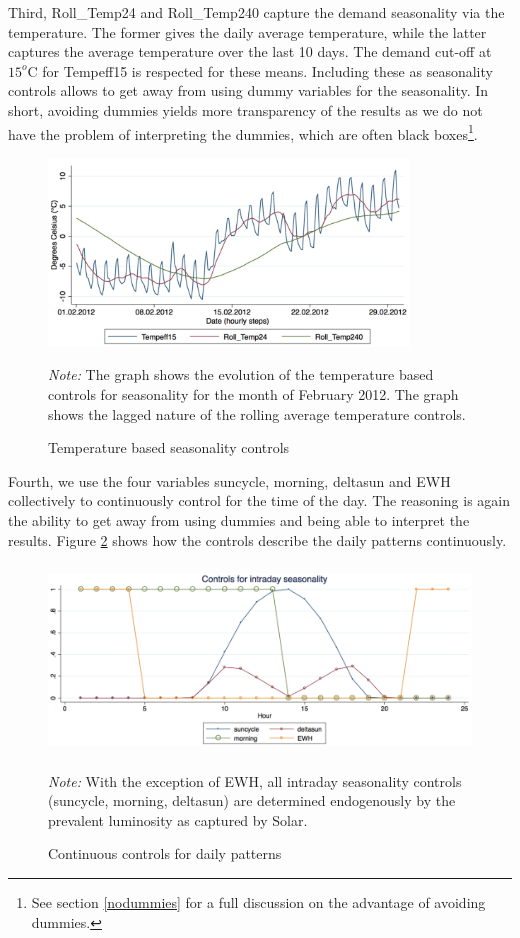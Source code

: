 Third, Roll\_Temp24 and Roll\_Temp240 capture the demand seasonality via the temperature. The former gives the daily average temperature, while the latter captures the average temperature over the last 10 days. The demand cut-off at $15^o$C for Tempeff15 is respected for these means.  Including these as seasonality controls allows to get away from using dummy variables for the seasonality. In short, avoiding dummies yields more transparency of the results as we do not have the problem of interpreting the dummies, which are often black boxes\footnote{See section \ref{nodummies} for a full discussion on the advantage of avoiding dummies.}. \\
\begin{figure}[!ht]
\begin{center}
\includegraphics[height=50mm]{figch2/tempseasonality2.pdf} 
\caption{Temperature based seasonality controls}
\label{tempseasonality2}
\end{center}
\emph{Note: } The graph shows the evolution of the temperature based controls for seasonality for the month of February 2012. The graph shows the lagged nature of the rolling average temperature controls. 
\end{figure}
Fourth, we use the four variables suncycle, morning, deltasun and EWH collectively to continuously control for the time of the day. The reasoning is again the ability to get away from using dummies and being able to interpret the results. Figure \ref{seasonalityday3} shows how the controls describe the daily patterns continuously. \\
\begin{figure}[!ht]
\begin{center}
\includegraphics[height=50mm]{figch2/seasonalityday3.pdf} 
\caption{Continuous controls for daily patterns}
\label{seasonalityday3}
\end{center}
\emph{Note:} With the exception of EWH, all intraday seasonality controls (suncycle, morning, deltasun) are determined endogenously by the prevalent luminosity as captured by Solar.
\end{figure}
